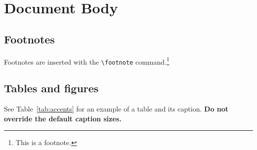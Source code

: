 \documentclass[11pt]{article}
\begin{document}




\section{Document Body}

\subsection{Footnotes}

Footnotes are inserted with the \verb|\footnote| command.\footnote{This is a footnote.}

\subsection{Tables and figures}

See Table~\ref{tab:accents} for an example of a table and its caption.
\textbf{Do not override the default caption sizes.}
\end{document}
